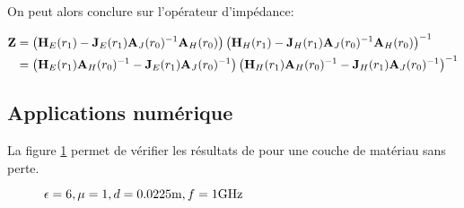 
        On peut alors conclure sur l'opérateur d'impédance:

        \begin{align}
            \mathbf{Z} &= 
            \left(\mathbf{H}_{E}(r_1) - \mathbf{J}_{E}(r_1)\mathbf{A}_{J}(r_0)^{-1}\mathbf{A}_{H}(r_0)\right)
            \left(\mathbf{H}_{H}(r_1) - \mathbf{J}_{H}(r_1)\mathbf{A}_{J}(r_0)^{-1}\mathbf{A}_{H}(r_0)\right)^{-1}
            \\
            &=
            \left(\mathbf{H}_{E}(r_1)\mathbf{A}_{H}(r_0)^{-1} - \mathbf{J}_{E}(r_1)\mathbf{A}_{J}(r_0)^{-1}\right)
            \left(\mathbf{H}_{H}(r_1)\mathbf{A}_{H}(r_0)^{-1} - \mathbf{J}_{H}(r_1)\mathbf{A}_{J}(r_0)^{-1}\right)^{-1}
        \end{align}


    \subsection{Applications numérique}

        La figure \ref{fig:imp_fourier:cylindre:hoppe} permet de vérifier les résultats de \cite[p.~62]{hoppe_impedance_1995} pour une couche de matériau sans perte.

        \begin{figure}[!hbt]
            \centering
            \caption{$\epsilon = 6, \mu = 1, d=0.0225\text{m}, f=1\text{GHz}$}
            \label{fig:imp_fourier:cylindre:hoppe}
        \end{figure}